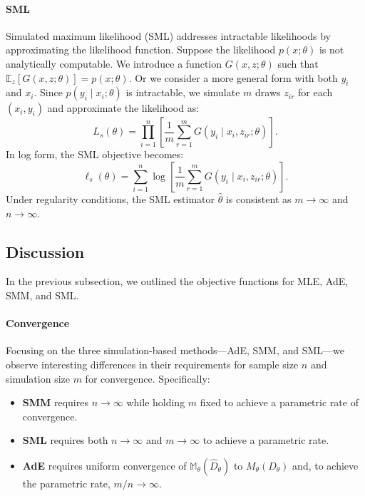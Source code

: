 \documentclass[12pt]{article}
\begin{document}
\paragraph{SML}
Simulated maximum likelihood (SML) addresses intractable likelihoods by
approximating the likelihood function. Suppose the likelihood \(p(x; \theta)\)
is not analytically computable. We introduce a function \(G(x, z; \theta)\)
such that \(\mathbb{E}_z[G(x, z; \theta)] = p(x; \theta)\). Or we consider a
more general form with both $y_i$ and $x_i$. Since \(p(y_i \mid x_i; \theta)\)
is intractable, we simulate \(m\) draws \(z_{ir}\) for each \((x_i, y_i)\) and
approximate the likelihood as:
\begin{equation*}
    L_s(\theta) = \prod_{i=1}^n \left[\frac{1}{m} \sum_{r=1}^m G(y_i \mid x_i, z_{ir}; \theta)\right].
\end{equation*}
In log form, the SML objective becomes:
\begin{equation*}
    \ell_s(\theta) = \sum_{i=1}^n \log \left[\frac{1}{m} \sum_{r=1}^m G(y_i \mid x_i, z_{ir}; \theta)\right].
\end{equation*}
Under regularity conditions, the SML estimator \(\hat{\theta}\) is consistent as \(m \to \infty\) and \(n \to \infty\).

\subsection{Discussion} \label{subsec:discussion}

In the previous subsection, we outlined the objective functions for MLE, AdE,
SMM, and SML.
\paragraph{Convergence} Focusing on the three simulation-based methods—AdE, SMM, and SML—we observe
interesting differences in their requirements for sample size \(n\) and
simulation size \(m\) for convergence. Specifically:

\begin{itemize}
    \item \textbf{SMM} requires \(n \to \infty\) while holding \(m\) fixed to achieve a parametric rate of convergence.
    \item \textbf{SML} requires both \(n \to \infty\) and \(m \to \infty\) to achieve a parametric rate.
    \item \textbf{AdE} requires uniform convergence of \(\mathbb{M}_\theta(\hat{D}_\theta)\) to \(M_\theta(D_\theta)\) and, to achieve the parametric rate, \(m/n \to \infty\).
\end{itemize}
\end{document}
